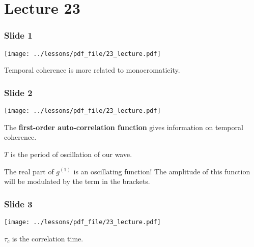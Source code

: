 \documentclass[../main/main.tex]{subfiles}
\begin{document}
\pagestyle{plain}

\section{Lecture 23}


\subsubsection*{Slide 1}

\begin{minipage}[]{0.5\linewidth}
\centering
\texttt{[image: ../lessons/pdf\_file/23\_lecture.pdf]}
\end{minipage}
\hspace{0.3cm}\vspace{0.3cm}
\begin{minipage}[c]{0.47\linewidth}

Temporal coherence is more related to monocromaticity.

\end{minipage}

\subsubsection*{Slide 2}

\begin{minipage}[]{0.5\linewidth}
\centering
\texttt{[image: ../lessons/pdf\_file/23\_lecture.pdf]}
\end{minipage}
\hspace{0.3cm}\vspace{0.3cm}
\begin{minipage}[c]{0.47\linewidth}

The \textbf{first-order auto-correlation function} gives information on temporal coherence.

\( T \) is the period of oscillation of our wave.

The real part of \( g^{(1)} \) is an oscillating function! The amplitude of this function will be modulated by the term in the brackets.

\end{minipage}

\subsubsection*{Slide 3}

\begin{minipage}[]{0.5\linewidth}
\centering
\texttt{[image: ../lessons/pdf\_file/23\_lecture.pdf]}
\end{minipage}
\hspace{0.3cm}\vspace{0.3cm}
\begin{minipage}[c]{0.47\linewidth}

\( \tau _c \) is the correlation time.


\end{minipage}
\end{document}
